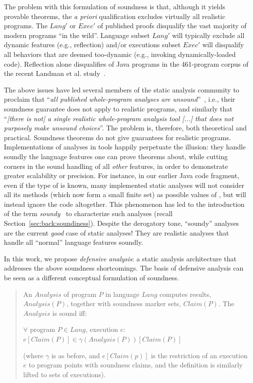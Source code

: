The problem with this formulation of soundness is that, although it yields provable theorems, the \emph{a priori} qualification excludes virtually all realistic programs. The $Lang'$ or $Exec'$ of published proofs disqualify the vast majority of modern programs ``in the wild''. Language subset $Lang'$ will typically exclude all dynamic features (e.g., reflection) and/or executions subset $Exec'$ will disqualify all behaviors that are deemed too-dynamic (e.g., invoking dynamically-loaded code). Reflection alone disqualifies  of Java programs in the 461-program corpus of the recent Landman et al. study~\cite{icse:2017:Landman}.

The above issues have led several members of the static analysis community to proclaim that ``\emph{all published whole-program analyses are unsound}''~\cite{article:2015:Livshits}, i.e., their soundness guarantee does not apply to realistic programs, and similarly that ``\emph{[there is not] a single realistic whole-program analysis tool [...] that does not purposely make unsound choices}''. The problem is, therefore, both theoretical and practical. Soundness theorems do not give guarantees for realistic programs. Implementations of analyses in tools happily perpetuate the illusion: they handle soundly the language features one can prove theorems about, while cutting corners in the sound handling of all \emph{other} features, in order to demonstrate greater scalability or precision. For instance, in our earlier Java code fragment, even if the type of  is known, many implemented static analyses will not consider all its methods (which now form a small finite set) as possible values of , but will instead ignore the code altogether. This phenomenon has led to the introduction of the term \emph{soundy}~\cite{article:2015:Livshits} to characterize such analyses (recall Section~\ref{sec:back:soundiness}). Despite the derogatory tone, ``soundy'' analyses are the current \emph{good} case of static analyses! They are realistic analyses that handle all ``normal'' language features soundly.

In this work, we propose \emph{defensive analysis}: a static analysis architecture that addresses the above soundness shortcomings. The basis of defensive analysis can be seen as a different conceptual formulation of soundness.

\begin{quote}
An $Analysis$ of program $P$ in language $Lang$ computes results, $Analysis(P)$, together with soundness marker sets, $Claim(P)$. The $Analysis$ is sound iff:

\hspace{8 mm} $\forall$ program $P \in Lang$, execution $e$: $e[Claim(P)] \in \gamma(Analysis(P))[Claim(P)]$

(where $\gamma$ is as before, and $e[Claim(p)]$ is the restriction of an execution $e$ to program points with soundness claims, and the definition is similarly lifted to sets of executions).
\end{quote}

